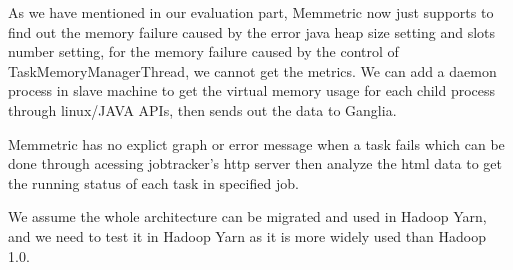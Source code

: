 As we have mentioned in our evaluation part, Memmetric now just supports to find out the memory failure caused by the error java heap size setting and slots number setting, for the memory failure caused by the control of TaskMemoryManagerThread, we cannot get the metrics. We can add a daemon process in slave machine to get the virtual memory usage for each child process through linux/JAVA APIs, then sends out the data to Ganglia. 

Memmetric has no explict graph or error message when a task fails which can be done through acessing jobtracker's http server then analyze the html data to get the running status of each task in specified job.

We assume the whole architecture can be migrated and used in Hadoop Yarn, and we need to test it in Hadoop Yarn as it is more widely used than Hadoop 1.0.

